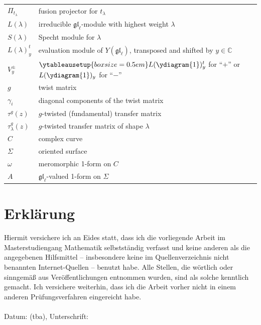 \documentclass[11pt]{report}
\theoremstyle{definition}
\theoremstyle{remark}
\theoremstyle{remark}
\newcommand{\C}{\mathbb{C}}
\begin{document}
\begin{tabular}{l|l}
$\Pi_{t_\lambda}$ & fusion projector for $t_\lambda$ \\
$L(\lambda)$ & irreducible $\mathfrak{gl}_\ell$-module with highest weight $\lambda$ \\
$S(\lambda)$ & Specht module for $\lambda$ \\
$L(\lambda)_y^t$ & evaluation module of $Y(\mathfrak{gl}_\ell)$, transposed and shifted by $y \in \C$ \\
$V_y^\pm$ & $\ytableausetup{boxsize=0.5em}L(\ydiagram{1})_y^t$ for “$+$” or $L(\ydiagram{1})_y$ for “$-$” \\
$g$ & twist matrix \\
$\gamma_i$ & diagonal components of the twist matrix \\
$\tau^g(z)$ & $g$-twisted (fundamental) transfer matrix \\
$\tau_\lambda^g(z)$ & $g$-twisted transfer matrix of shape $\lambda$ \\
$C$ & complex curve \\
$\Sigma$ & oriented surface \\
$\omega$ & meromorphic 1-form on $C$ \\
$A$ & $\mathfrak{gl}_\ell$-valued 1-form on $\Sigma$
\end{tabular}

\pagebreak

\printindex




\pagebreak

\section*{Erklärung}

Hiermit versichere ich an Eides statt, dass ich die vorliegende Arbeit im Masterstudiengang Mathematik selbstständig verfasst und keine anderen als die angegebenen Hilfsmittel – insbesondere keine im Quellenverzeichnis nicht benannten Internet-Quellen – benutzt habe. Alle Stellen, die wörtlich oder sinngemäß aus Veröffentlichungen entnommen wurden, sind als solche kenntlich gemacht. Ich versichere weiterhin, dass ich die Arbeit vorher nicht in einem anderen Prüfungsverfahren eingereicht habe.
~\\~\\
Datum: (tba), Unterschrift:

\end{document}
